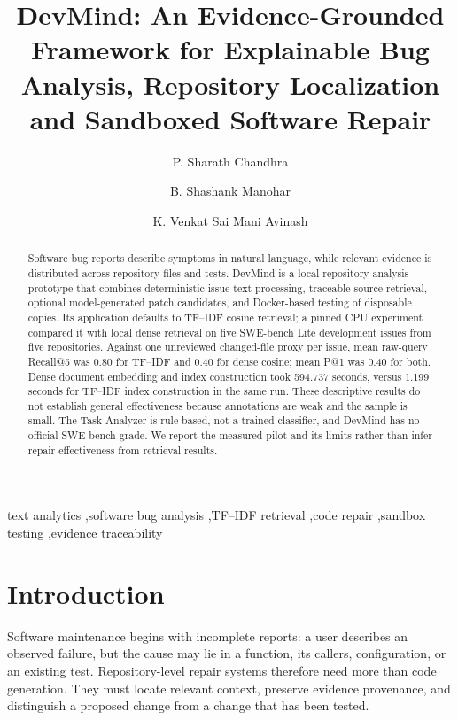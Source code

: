 \documentclass[3p,times,procedia]{elsarticle}
\begin{document}
\begin{frontmatter}
\title{DevMind: An Evidence-Grounded Framework for Explainable Bug Analysis, Repository Localization and Sandboxed Software Repair}

\author[a]{P. Sharath Chandhra}
\author[a]{B. Shashank Manohar}
\author[a]{K. Venkat Sai Mani Avinash}
\address[a]{Department of Computer Science and Engineering, [College/University], [City], India}

\begin{abstract}
Software bug reports describe symptoms in natural language, while relevant evidence is distributed across repository files and tests. DevMind is a local repository-analysis prototype that combines deterministic issue-text processing, traceable source retrieval, optional model-generated patch candidates, and Docker-based testing of disposable copies. Its application defaults to TF--IDF cosine retrieval; a pinned CPU experiment compared it with local dense retrieval on five SWE-bench Lite development issues from five repositories. Against one unreviewed changed-file proxy per issue, mean raw-query Recall@5 was 0.80 for TF--IDF and 0.40 for dense cosine; mean P@1 was 0.40 for both. Dense document embedding and index construction took 594.737 seconds, versus 1.199 seconds for TF--IDF index construction in the same run. These descriptive results do not establish general effectiveness because annotations are weak and the sample is small. The Task Analyzer is rule-based, not a trained classifier, and DevMind has no official SWE-bench grade. We report the measured pilot and its limits rather than infer repair effectiveness from retrieval results.\end{abstract}

\begin{keyword}
text analytics \sep software bug analysis \sep TF--IDF retrieval \sep code repair \sep sandbox testing \sep evidence traceability
\end{keyword}
\end{frontmatter}

\section{Introduction}
Software maintenance begins with incomplete reports: a user describes an observed failure, but the cause may lie in a function, its callers, configuration, or an existing test. Repository-level repair systems therefore need more than code generation. They must locate relevant context, preserve evidence provenance, and distinguish a proposed change from a change that has been tested.
\end{document}
